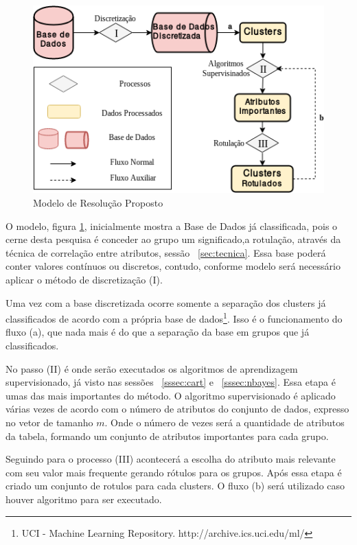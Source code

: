 \begin{figure}[h!]
        \centering
        \includegraphics[scale=0.7]{figs/modeloResolucao.png}
        \caption{Modelo de Resolução Proposto} \label{fig:modeloresolucao}
\end{figure}

O modelo, figura \ref{fig:modeloresolucao}, inicialmente mostra a Base de Dados  já classificada, pois o cerne desta pesquisa é conceder ao grupo um significado,a rotulação,  através da técnica de correlação entre atributos, sessão ~\ref{sec:tecnica}. Essa base poderá conter  valores contínuos ou discretos, contudo, conforme modelo será necessário aplicar o método de discretização (I).

Uma vez com a base discretizada ocorre somente a separação dos clusters já classificados de acordo com a própria base de dados\footnote{UCI - Machine Learning Repository. http://archive.ics.uci.edu/ml/ }. Isso é o funcionamento do fluxo (a), que nada mais é do que a separação da base em grupos que já classificados.

No passo (II) é onde serão executados os algoritmos de aprendizagem supervisionado, já visto nas sessões ~\ref{sssec:cart} e ~\ref{sssec:nbayes}. Essa etapa é umas das mais importantes do método. O algoritmo supervisionado é aplicado várias vezes de acordo com o número de atributos do conjunto de dados, expresso no vetor de tamanho ${m}$. Onde o número de vezes será a quantidade de atributos da tabela, formando um conjunto de atributos importantes para cada grupo.

Seguindo para o processo (III) acontecerá a escolha do atributo mais relevante com seu valor mais frequente gerando rótulos para os grupos. Após essa etapa é criado um conjunto de rotulos para cada clusters. O fluxo (b) será utilizado caso houver algoritmo para ser executado.

